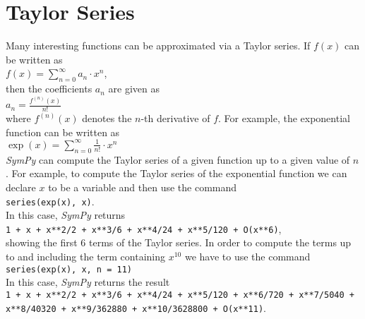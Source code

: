 \documentclass{report}
\newcommand{\ds}{\displaystyle}
\begin{document}
\section{Taylor Series}
Many interesting functions can be approximated via a Taylor series.  If $f(x)$ can be written
as
\\[0.2cm]
\hspace*{1.3cm}
$\ds f(x) = \sum\limits_{n=0}^\infty a_n \cdot x^n$,
\\[0.2cm]
then the coefficients $a_n$ are given as
\\[0.2cm]
\hspace*{1.3cm}
$\ds a_n = \frac{f^{(n)}(x)}{n!}$
\\[0.2cm]
where $f^{(n)}(x)$ denotes the $n$-th derivative of $f$.  For example, the exponential function can
be written as
\\[0.2cm]
\hspace*{1.3cm}
$\ds\exp(x) = \sum\limits_{n=0}^\infty \frac{1}{n!} \cdot x^n$
\\[0.2cm]
\textsl{SymPy} can compute the Taylor series of a given function up to a given value of $n$.  For
example, to compute the 
Taylor series of the exponential function we can declare $x$ to be a variable and then use the command
\\[0.2cm]
\hspace*{1.3cm}
\texttt{series(exp(x), x)}.
\\[0.2cm]
In this case, \textsl{SymPy} returns
\\[0.2cm]
\hspace*{1.3cm}
\texttt{1 + x + x**2/2 + x**3/6 + x**4/24 + x**5/120 + O(x**6)},
\\[0.2cm]
showing the first 6 terms of the Taylor series.  In order to compute the terms up to and including
the term containing $x^{10}$ we have to use the command
\\[0.2cm]
\hspace*{1.3cm}
\texttt{series(exp(x), x, n = 11)}
\\[0.2cm]
In this case, \textsl{SymPy} returns the result
\\[0.2cm]
\hspace*{1.3cm}
\texttt{1 + x + x**2/2 + x**3/6 + x**4/24 + x**5/120 + x**6/720 + x**7/5040 +} \\
\hspace*{1.3cm}
\texttt{x**8/40320 + x**9/362880 + x**10/3628800 + O(x**11)}.
\end{document}
